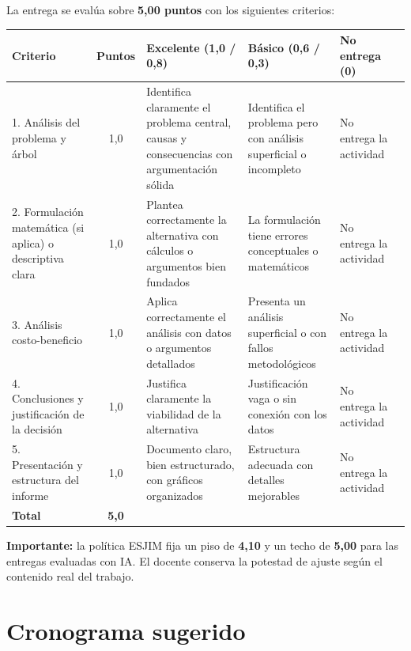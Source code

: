 \documentclass[11pt, a4paper]{article}
\begin{document}
La entrega se eval\'ua sobre \textbf{5,00 puntos} con los siguientes criterios:

\begin{center}
\footnotesize
\begin{tabularx}{\textwidth}{@{}p{3.4cm}cXXXX@{}}
\toprule
\textbf{Criterio} & \textbf{Puntos} & \textbf{Excelente (1,0 / 0,8)} & \textbf{B\'asico (0,6 / 0,3)} & \textbf{No entrega (0)}\\
\midrule
1. An\'alisis del problema y \'arbol
& 1,0
& Identifica claramente el problema central, causas y consecuencias con argumentaci\'on s\'olida
& Identifica el problema pero con an\'alisis superficial o incompleto
& No entrega la actividad\\[6pt]
2. Formulaci\'on matem\'atica (si aplica) o descriptiva clara
& 1,0
& Plantea correctamente la alternativa con c\'alculos o argumentos bien fundados
& La formulaci\'on tiene errores conceptuales o matem\'aticos
& No entrega la actividad\\[6pt]
3. An\'alisis costo-beneficio
& 1,0
& Aplica correctamente el an\'alisis con datos o argumentos detallados
& Presenta un an\'alisis superficial o con fallos metodol\'ogicos
& No entrega la actividad\\[6pt]
4. Conclusiones y justificaci\'on de la decisi\'on
& 1,0
& Justifica claramente la viabilidad de la alternativa
& Justificaci\'on vaga o sin conexi\'on con los datos
& No entrega la actividad\\[6pt]
5. Presentaci\'on y estructura del informe
& 1,0
& Documento claro, bien estructurado, con gr\'aficos organizados
& Estructura adecuada con detalles mejorables
& No entrega la actividad\\
\midrule
\textbf{Total} & \textbf{5,0} & & & \\
\bottomrule
\end{tabularx}
\end{center}

\begin{cajaAlerta}
\textbf{Importante:} la pol\'itica ESJIM fija un piso de \textbf{4,10} y un techo de \textbf{5,00} para las entregas evaluadas con IA. El docente conserva la potestad de ajuste seg\'un el contenido real del trabajo.
\end{cajaAlerta}

\section{Cronograma sugerido}
\end{document}

